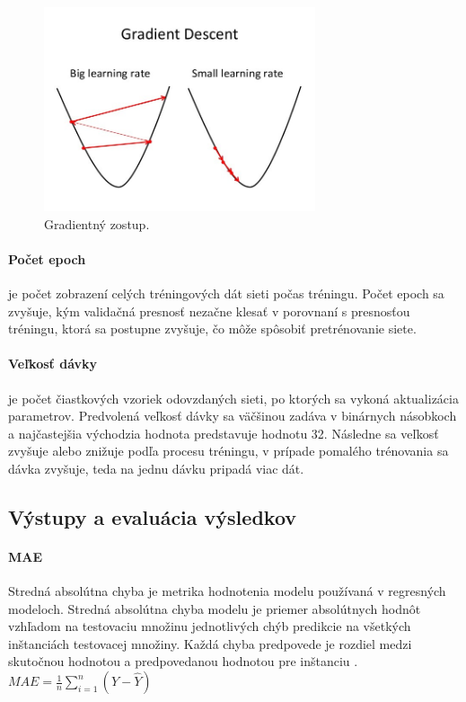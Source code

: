 \begin{figure}[!htbp]
  \centering
  \includegraphics[width=8cm]{img/learningrate.jpg}
  \caption{Gradientný zostup.}
  \label{learningrate}
\end{figure}

\paragraph{Počet epoch} je počet zobrazení celých tréningových dát sieti počas tréningu. Počet epoch sa zvyšuje, kým validačná presnosť nezačne klesať v porovnaní s presnosťou tréningu, ktorá sa postupne zvyšuje, čo môže spôsobiť pretrénovanie siete.

\paragraph{Veľkosť dávky} je počet čiastkových vzoriek odovzdaných sieti, po ktorých sa vykoná aktualizácia parametrov. Predvolená veľkosť dávky sa väčšinou zadáva v binárnych násobkoch a najčastejšia východzia hodnota predstavuje hodnotu 32. Následne sa veľkosť zvyšuje alebo znižuje podľa procesu tréningu, v prípade pomalého trénovania sa dávka zvyšuje, teda na jednu dávku pripadá viac dát.


\subsection{Výstupy a evaluácia výsledkov}
\label{evaluacia}

\paragraph{MAE} Stredná absolútna chyba je metrika hodnotenia modelu používaná v regresných modeloch. Stredná absolútna chyba modelu je priemer absolútnych hodnôt vzhľadom na testovaciu množinu jednotlivých chýb predikcie na všetkých inštanciách testovacej množiny. Každá chyba predpovede je rozdiel medzi skutočnou hodnotou a predpovedanou hodnotou pre inštanciu \cite{mae}. \newline
$MAE = {\frac{1}{n}\sum_{i=1}^{n}(Y-\widehat{Y})}$

